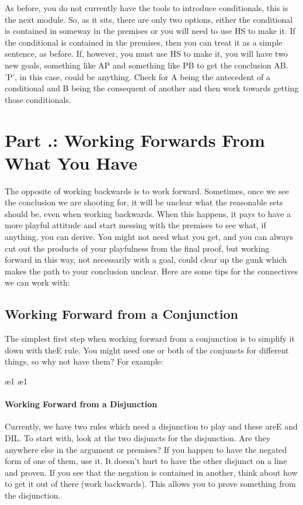 As before, you do not currently have the tools to introduce conditionals, this is the next module. So, as it sits, there are only two options, either the conditional is contained in someway in the premises or you will need to use HS to make it. If the conditional is contained in the premises, then you can treat it as a simple sentence, as before. If, however, you must use HS to make it, you will have two new goals, something like A\eif P and something like P\eif B to get the conclusion A\eif B. 'P', in this case, could be anything. Check for A being the antecedent of a conditional and B being the consequent of another and then work towards getting those conditionals. 

\section{Part \thechapcount.\theseccount: Working Forwards From What You Have}
The opposite of working backwards is to work forward. Sometimes, once we see the conclusion we are shooting for, it will be unclear what the reasonable sets should be, even when working backwards. When this happens, it pays to have a more playful attitude and start messing with the premises to see what, if anything, you can derive. You might not need what you get, and you can always cut out the products of your playfulness from the final proof, but working forward in this way, not necessarily with a goal, could clear up the gunk which makes the path to your conclusion unclear. Here are some tips for the connectives we can work with:

\subsection{Working Forward from a Conjunction}

The simplest first step when working forward from a conjunction is to simplify it down with the\eand E rule. You might need one or both of the conjuncts for different things, so why not have them? For example:
\begin{fitchproof}
\ae{1}	
\ae{1}	
\end{fitchproof}

\paragraph{Working Forward from a Disjunction}

Currently, we have two rules which need a disjunction to play and these are\eor E and DIL. To start with, look at the two disjuncts for the disjunction. Are they anywhere else in the argument or premises? If you happen to have the negated form of one of them, use it. It doesn't hurt to have the other disjunct on a line and proven. If you see that the negation is contained in another, think about how to get it out of there (work backwards). This allows you to prove something from the disjunction. 

